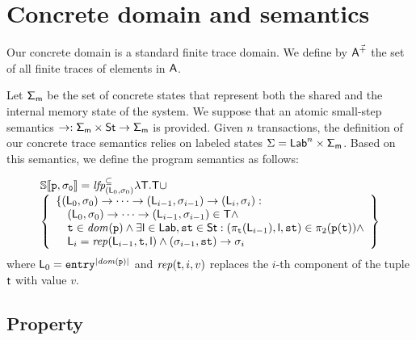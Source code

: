 

\section{Concrete domain and semantics}
Our concrete domain is a standard finite trace domain. We define by $\mathsf{A}^{\vec{+}}$ the set of all finite traces of elements in $\mathsf{A}$.


Let $\mathsf{\Sigma_m}$ be the set of concrete states that represent both the shared and the internal memory state of the system. We suppose that an atomic small-step semantics $\to : \mathsf{\Sigma_m} \times \mathsf{St} \rightarrow\mathsf{\Sigma_m}$ is provided. Given $n$ transactions, the definition of our concrete trace semantics relies on labeled states $\Sigma = \mathsf{Lab}^n \times \mathsf{\Sigma_m}$.
Based on this semantics, we define the program semantics as follows:

\[
\begin{array}{l}
\mathbb{S}\llbracket \mathtt{\mathtt{p}, \sigma_0} \rrbracket = \textit{lfp}_{(\mathsf{L}_0, \mathsf{\sigma}_0)}^{\subseteq} \lambda \mathsf{T} . \mathsf{T} \cup\\
\left\{
\begin{array}{l}
 \{(\mathsf{L}_0, \mathsf{\sigma}_0) \to \cdots \to (\mathsf{L}_{i-1}, \mathsf{\sigma}_{i-1}) \to (\mathsf{L}_i, \mathsf{\sigma}_i) :\\
\hspace{10pt} (\mathsf{L}_0, \mathsf{\sigma}_0) \to \cdots \to (\mathsf{L}_{i-1}, \mathsf{\sigma}_{i-1})  \in \mathsf{T} \land\\
\hspace{10pt} \mathtt{t} \in \mathit{dom}(\mathtt{p}) \land \exists \mathsf{l} \in \mathsf{Lab}, \mathtt{st} \in \mathsf{St} : (\pi_{\mathtt{t}}(\mathsf{L}_{i-1}), \mathsf{l}, \mathtt{st}) \in \pi_2(\mathtt{p}(\mathtt{t})) \land\\
\hspace{10pt}\mathsf{L}_i = \mathit{rep}(\mathsf{L}_{i-1}, \mathtt{t}, \mathsf{l}) \land (\mathsf{\sigma}_{i-1}, \mathtt{st}) \to \mathsf{\sigma}_{i}
\end{array}
\right\}\\
\end{array}
\]
where $\mathsf{L}_0=\mathtt{entry}^{|\mathit{dom}(\mathtt{p})|}$ and $\mathit{rep}(\mathsf{t}, i, v)$ replaces the $i$-th component of the tuple $\mathsf{t}$ with value $v$.

\subsection{Property}

